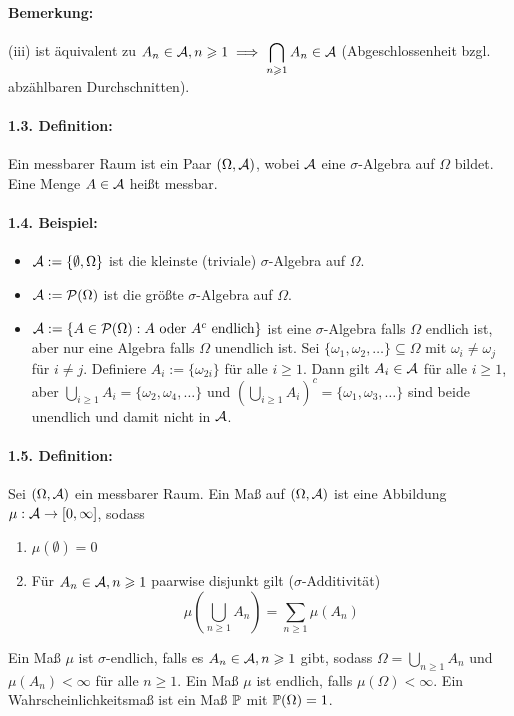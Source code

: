 \paragraph{Bemerkung:} (iii) ist \"aquivalent zu $A_n\in\mathcal{A},n\geqslant1\implies\displaystyle\bigcap_{n\geqslant1}A_n\in\mathcal{A}$ (Abgeschlossenheit bzgl. abz\"ahlbaren Durchschnitten).

\paragraph{1.3. Definition:} Ein messbarer Raum ist ein Paar $(\Omega,\mathcal{A})$, wobei $\mathcal{A}$ eine $\sigma$-Algebra auf $\Omega$ bildet. Eine Menge $A\in\mathcal{A}$ hei\ss{}t messbar. 

\paragraph{1.4. Beispiel:}
\begin{itemize}
    \item $\mathcal{A}:=\{\emptyset,\Omega\}$ ist die kleinste (triviale) $\sigma$-Algebra auf $\Omega$.
    \item $\mathcal{A}:=\mathcal{P}(\Omega)$ ist die gr\"o\ss{}te $\sigma$-Algebra auf $\Omega$.
    \item $\mathcal{A}:=\{A\in\mathcal{P}(\Omega):A\text{ oder }A^c\text{ endlich}\}$ ist eine $\sigma$-Algebra falls $\Omega$ endlich ist, aber nur eine Algebra falls $\Omega$ unendlich ist. Sei $\{\omega_1,\omega_2,\hdots\}\subseteq\Omega$ mit $\omega_i\neq\omega_j$ f\"ur $i\neq j$. Definiere $A_i:=\{\omega_{2i}\}$ f\"ur alle $i\geq1$. Dann gilt $A_i\in\mathcal{A}$ f\"ur alle $i\geq1$, aber $\bigcup_{i\geq1}A_i=\{\omega_2,\omega_4,\hdots\}$ und $\left(\bigcup_{i\geq1}A_i\right)^c=\{\omega_1,\omega_3,\hdots\}$ sind beide unendlich und damit nicht in $\mathcal{A}$.
\end{itemize}

\paragraph{1.5. Definition:}Sei $(\Omega,\mathcal{A})$ ein messbarer Raum.
Ein Ma\ss{} auf $(\Omega,\mathcal{A})$ ist eine Abbildung $\mu:\mathcal{A}\to[0,\infty]$, sodass 
    \begin{enumerate}[label=(\roman*)]
        \item $\mu(\emptyset)=0$
        \item F\"ur $A_n\in\mathcal{A},n\geqslant1$ paarwise disjunkt gilt ($\sigma$-Additivit\"at)
        $$\mu\left(\bigcup_{n\geq1}A_n\right)=\sum_{n\geq1}\mu(A_n)$$
    \end{enumerate}
Ein Ma\ss{} $\mu$ ist $\sigma$-endlich, falls es $A_n\in\mathcal{A},n\geqslant1$ gibt, sodass $\Omega=\displaystyle\bigcup_{n\geq1}A_n$ und $\mu(A_n)<\infty$ f\"ur alle $n\geq1$. Ein Ma\ss{} $\mu$ ist endlich, falls $\mu(\Omega)<\infty$. Ein Wahrscheinlichkeitsma\ss{} ist ein Ma\ss{} $\mathbb{P}$ mit $\mathbb{P}(\Omega)=1$. 

